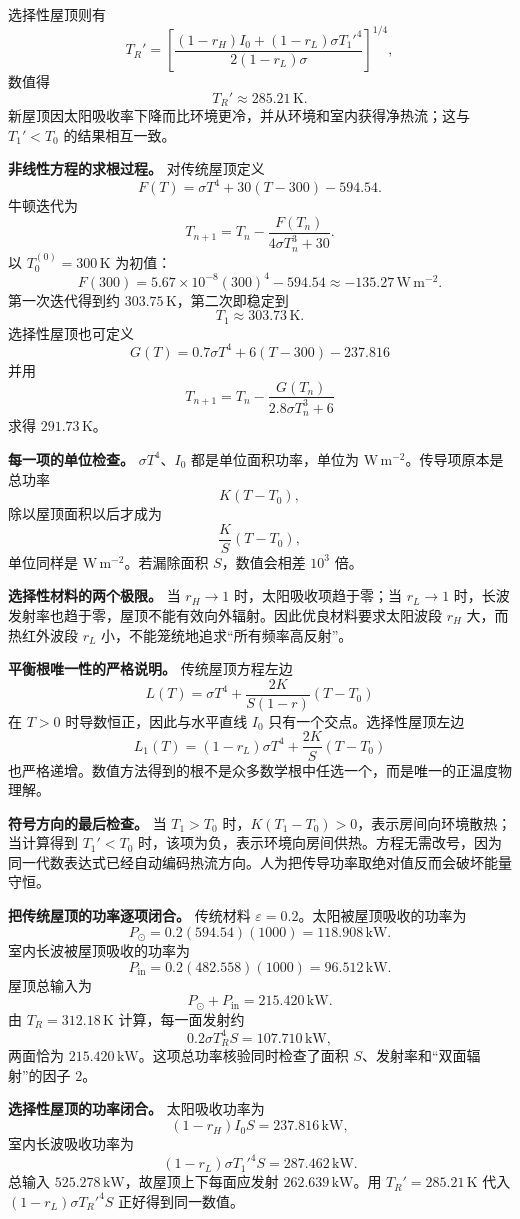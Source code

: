 \documentclass[12pt,a4paper,UTF8]{ctexart}
\begin{document}
选择性屋顶则有 \[
T_R'=
\left[
\frac{(1-r_H)I_0+(1-r_L)\sigma T_1'^4}
{2(1-r_L)\sigma}
\right]^{1/4},
\] 数值得 \[
T_R'\approx285.21\,\mathrm K.
\] 新屋顶因太阳吸收率下降而比环境更冷，并从环境和室内获得净热流；这与
\(T_1'<T_0\) 的结果相互一致。

\textbf{非线性方程的求根过程。} 对传统屋顶定义 \[
F(T)=\sigma T^4+30(T-300)-594.54.
\] 牛顿迭代为 \[
T_{n+1}
=T_n-\frac{F(T_n)}{4\sigma T_n^3+30}.
\] 以 \(T_0^{(0)}=300\,\mathrm K\) 为初值： \[
F(300)
=5.67\times10^{-8}(300)^4-594.54
\approx-135.27\,\mathrm{W\,m^{-2}}.
\] 第一次迭代得到约 \(303.75\,\mathrm K\)，第二次即稳定到 \[
T_1\approx303.73\,\mathrm K.
\] 选择性屋顶也可定义 \[
G(T)=0.7\sigma T^4+6(T-300)-237.816
\] 并用 \[
T_{n+1}=T_n-\frac{G(T_n)}{2.8\sigma T_n^3+6}
\] 求得 \(291.73\,\mathrm K\)。

\textbf{每一项的单位检查。} \(\sigma T^4\)、\(I_0\)
都是单位面积功率，单位为 \(\mathrm{W\,m^{-2}}\)。传导项原本是总功率 \[
K(T-T_0),
\] 除以屋顶面积以后才成为 \[
\frac KS(T-T_0),
\] 单位同样是 \(\mathrm{W\,m^{-2}}\)。若漏除面积 \(S\)，数值会相差
\(10^3\) 倍。

\textbf{选择性材料的两个极限。} 当 \(r_H\to1\) 时，太阳吸收项趋于零；当
\(r_L\to1\)
时，长波发射率也趋于零，屋顶不能有效向外辐射。因此优良材料要求太阳波段
\(r_H\) 大，而热红外波段 \(r_L\) 小，不能笼统地追求``所有频率高反射''。

\textbf{平衡根唯一性的严格说明。} 传统屋顶方程左边 \[
L(T)=\sigma T^4+
\frac{2K}{S(1-r)}(T-T_0)
\] 在 \(T>0\) 时导数恒正，因此与水平直线 \(I_0\)
只有一个交点。选择性屋顶左边 \[
L_1(T)=(1-r_L)\sigma T^4+\frac{2K}{S}(T-T_0)
\]
也严格递增。数值方法得到的根不是众多数学根中任选一个，而是唯一的正温度物理解。

\textbf{符号方向的最后检查。} 当 \(T_1>T_0\)
时，\(K(T_1-T_0)>0\)，表示房间向环境散热；当计算得到 \(T_1'<T_0\)
时，该项为负，表示环境向房间供热。方程无需改号，因为同一代数表达式已经自动编码热流方向。人为把传导功率取绝对值反而会破坏能量守恒。

\textbf{把传统屋顶的功率逐项闭合。} 传统材料
\(\varepsilon=0.2\)。太阳被屋顶吸收的功率为 \[
P_{\odot}=0.2(594.54)(1000)
=118.908\,\mathrm{kW}.
\] 室内长波被屋顶吸收的功率为 \[
P_{\mathrm{in}}
=0.2(482.558)(1000)
=96.512\,\mathrm{kW}.
\] 屋顶总输入为 \[
P_{\odot}+P_{\mathrm{in}}
=215.420\,\mathrm{kW}.
\] 由 \(T_R=312.18\,\mathrm K\) 计算，每一面发射约 \[
0.2\sigma T_R^4S
=107.710\,\mathrm{kW},
\] 两面恰为 \(215.420\,\mathrm{kW}\)。这项总功率核验同时检查了面积
\(S\)、发射率和``双面辐射''的因子 \(2\)。

\textbf{选择性屋顶的功率闭合。} 太阳吸收功率为 \[
(1-r_H)I_0S
=237.816\,\mathrm{kW},
\] 室内长波吸收功率为 \[
(1-r_L)\sigma T_1'^4S
=287.462\,\mathrm{kW}.
\] 总输入 \(525.278\,\mathrm{kW}\)，故屋顶上下每面应发射
\(262.639\,\mathrm{kW}\)。用 \(T_R'=285.21\,\mathrm K\) 代入
\((1-r_L)\sigma T_R'^4S\) 正好得到同一数值。
\end{document}
